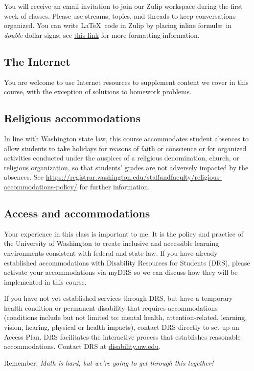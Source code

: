 \documentclass[11pt,twoside]{amsart}
\begin{document}
You will receive an email invitation to join our Zulip workspace during the first week of classes. Please use streams, topics, and threads to keep conversations organized. You can write \LaTeX~code in Zulip by placing inline formul\ae~in \emph{double} dollar signs; see \href{https://zulip.com/help/format-your-message-using-markdown#latex}{this link} for more formatting information.

\subsection*{The Internet}
You are welcome to use Internet resources to supplement content we cover in this course, with the exception of solutions to homework problems.

\subsection*{Religious accommodations}
In line with Washington state law, this course accommodates student absences to allow students to take holidays for reasons of faith or conscience or for organized activities conducted under the auspices of a religious denomination, church, or religious organization, so that students’ grades are not adversely impacted by the absences. See \url{https://registrar.washington.edu/staffandfaculty/religious-accommodations-policy/} for further information.

\subsection*{Access and accommodations}
Your experience in this class is important to me. It is the policy and practice of the University of Washington to create inclusive and accessible learning environments consistent with federal and state law. If you have already established accommodations with Disability Resources for Students (DRS), please activate your accommodations via myDRS so we can discuss how they will be implemented in this course.

If you have not yet established services through DRS, but have a temporary health condition or permanent disability that requires accommodations (conditions include but not limited to: mental health, attention-related, learning, vision, hearing, physical or health impacts), contact DRS directly to set up an Access Plan. DRS facilitates the interactive process that establishes reasonable accommodations. Contact DRS at \url{disability.uw.edu}.

\bigskip \bigskip
\hrulefill
\bigskip \bigskip

\begin{center}
Remember: \emph{Math is hard, but we're going to get through this together!}
\end{center}
\end{document}
